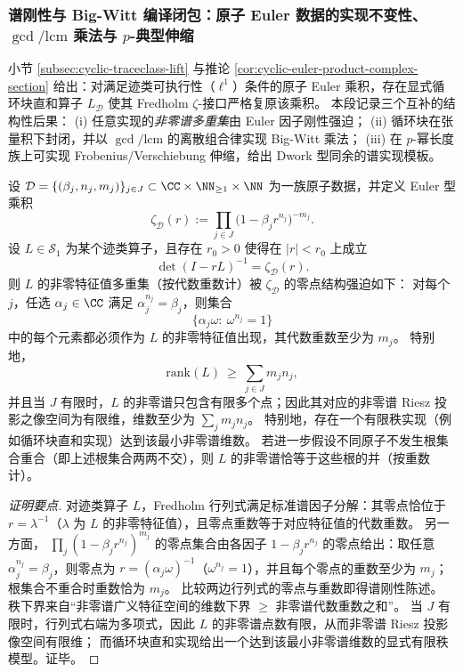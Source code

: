 \subsubsection{谱刚性与 Big-Witt 编译闭包：原子 Euler 数据的实现不变性、\texorpdfstring{$\gcd/\mathrm{lcm}$}{gcd/lcm} 乘法与 \texorpdfstring{$p$}{p}-典型伸缩}\label{subsec:operator-cyclic-traceclass-witt-rigidity}
小节 \ref{subsec:cyclic-traceclass-lift} 与推论 \ref{cor:cyclic-euler-product-complex-section} 给出：对满足迹类可执行性（\(\ell^1\)）条件的原子 Euler 乘积，存在显式循环块直和算子 \(L_{\mathcal D}\) 使其 Fredholm \(\zeta\)-接口严格复原该乘积。
本段记录三个互补的结构性后果：
(i) 任意实现的\emph{非零谱多重集}由 Euler 因子刚性强迫；
(ii) 循环块在张量积下封闭，并以 \(\gcd/\mathrm{lcm}\) 的离散组合律实现 Big-Witt 乘法；
(iii) 在 \(p\)-幂长度族上可实现 Frobenius/Verschiebung 伸缩，给出 Dwork 型同余的谱实现模板。

\begin{proposition}\label{prop:cyclic-euler-spectral-rigidity}
设 \(\mathcal D=\{(\beta_j,n_j,m_j)\}_{j\in J}\subset \CC\times\NN_{\ge 1}\times\NN\) 为一族原子数据，并定义 Euler 型乘积
\[
\zeta_{\mathcal D}(r):=\prod_{j\in J}\bigl(1-\beta_j r^{n_j}\bigr)^{-m_j}.
\]
设 \(L\in\mathcal{S}_1\) 为某个迹类算子，且存在 \(r_0>0\) 使得在 \(|r|<r_0\) 上成立
\[
\det(I-rL)^{-1}=\zeta_{\mathcal D}(r).
\]
则 \(L\) 的非零特征值多重集（按代数重数计）被 \(\zeta_{\mathcal D}\) 的零点结构强迫如下：
对每个 \(j\)，任选 \(\alpha_j\in\CC\) 满足 \(\alpha_j^{n_j}=\beta_j\)，则集合
\[
\{\alpha_j\omega:\ \omega^{n_j}=1\}
\]
中的每个元素都必须作为 \(L\) 的非零特征值出现，其代数重数至少为 \(m_j\)。
特别地，
\[
\mathrm{rank}(L)\ \ge\ \sum_{j\in J}m_jn_j,
\]
并且当 \(J\) 有限时，\(L\) 的非零谱只包含有限多个点；因此其对应的非零谱 Riesz 投影之像空间为有限维，维数至少为 \(\sum_{j}m_jn_j\)。
特别地，存在一个有限秩实现（例如循环块直和实现）达到该最小非零谱维数。
若进一步假设不同原子不发生根集合重合（即上述根集合两两不交），则 \(L\) 的非零谱恰等于这些根的并（按重数计）。
\end{proposition}

\begin{proof}[证明要点]
对迹类算子 \(L\)，Fredholm 行列式满足标准谱因子分解：其零点恰位于 \(r=\lambda^{-1}\)（\(\lambda\) 为 \(L\) 的非零特征值），且零点重数等于对应特征值的代数重数。
另一方面，
\(
\prod_{j}(1-\beta_j r^{n_j})^{m_j}
\)
的零点集合由各因子 \(1-\beta_j r^{n_j}\) 的零点给出：取任意 \(\alpha_j^{n_j}=\beta_j\)，则零点为 \(r=(\alpha_j\omega)^{-1}\)（\(\omega^{n_j}=1\)），并且每个零点的重数至少为 \(m_j\)；根集合不重合时重数恰为 \(m_j\)。
比较两边行列式的零点与重数即得谱刚性陈述。
秩下界来自“非零谱广义特征空间的维数下界 \(\ge\) 非零谱代数重数之和”。
当 \(J\) 有限时，行列式右端为多项式，因此 \(L\) 的非零谱点数有限，从而非零谱 Riesz 投影像空间有限维；
而循环块直和实现给出一个达到该最小非零谱维数的显式有限秩模型。证毕。
\end{proof}

